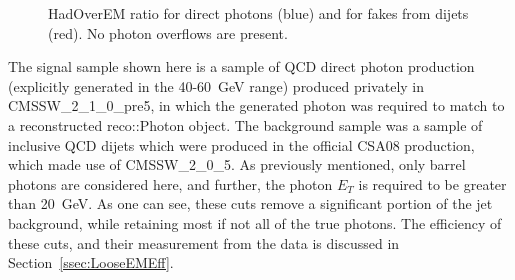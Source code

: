\documentclass{cmspaper}
\begin{document}
\begin{figure}[hbtp]
  \begin{center}
    \caption{HadOverEM ratio for direct photons (blue) and for fakes from dijets (red).  No photon overflows are present.}
    \label{fig:HadOverEM_EMLoose}
  \end{center}
\end{figure}

The signal sample shown here is a sample of QCD direct photon production (explicitly generated in the 40-60~GeV range) produced privately 
in CMSSW\_2\_1\_0\_pre5, in which the generated photon was required to match to a reconstructed reco::Photon object.  The background sample 
was a sample of inclusive QCD dijets which were produced in the official CSA08 production, which made use of CMSSW\_2\_0\_5.  As previously 
mentioned, only barrel photons are considered here, and further, the photon $E_{T}$ is required to be greater than 20~GeV.
As one can see, these cuts remove a significant portion of the jet background, while retaining most if not all of the true photons.  
The efficiency of these cuts, and their measurement from the data is discussed in Section~\ref{ssec:LooseEMEff}.
\end{document}
